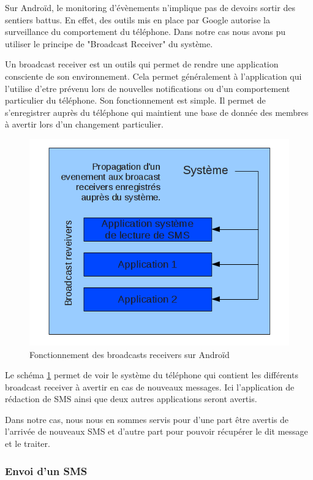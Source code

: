 Sur Androïd, le monitoring d'évènements n'implique pas de devoirs sortir des sentiers battus. En effet,
des outils mis en place par Google autorise la surveillance du comportement du téléphone. Dans notre cas 
nous avons pu utiliser le principe de "Broadcast Receiver" du système. 

Un broadcast receiver est un outils qui permet de rendre une application consciente de son environnement.
Cela permet généralement à l'application qui l'utilise d'etre prévenu lors de nouvelles notifications ou 
d'un comportement particulier du téléphone.
Son fonctionnement est simple. Il permet de s'enregistrer auprès du téléphone qui maintient une base de donnée des 
membres à avertir lors d'un changement particulier.

\begin{figure}[!h]
	\center
	\includegraphics[width=12cm]{img/broadcast-receivers.png}
	\caption{Fonctionnement des broadcasts receivers sur Androïd}
	\label{broadcast-receivers}
\end{figure}

Le schéma \ref{broadcast-receivers} permet de voir le système du téléphone qui contient les différents broadcast receiver à avertir en cas de nouveaux messages. Ici l'application de rédaction de SMS ainsi que deux autres 
applications seront avertis.

Dans notre cas, nous nous en sommes servis pour d'une part être avertis de l'arrivée de nouveaux SMS et d'autre part pour pouvoir récupérer le dit message et le traiter.
\\


\subsubsection{Envoi d'un SMS}

